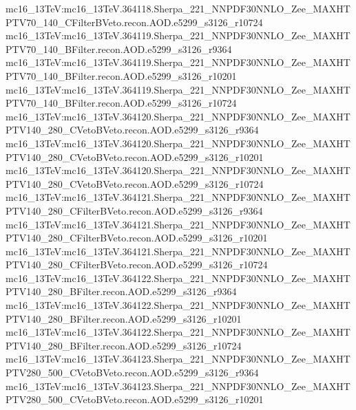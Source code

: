 { mc16\_13TeV:mc16\_13TeV.364118.Sherpa\_221\_NNPDF30NNLO\_Zee\_MAXHTPTV70\_140\_CFilterBVeto.recon.AOD.e5299\_s3126\_r10724 \newline  
 mc16\_13TeV:mc16\_13TeV.364119.Sherpa\_221\_NNPDF30NNLO\_Zee\_MAXHTPTV70\_140\_BFilter.recon.AOD.e5299\_s3126\_r9364   \newline
 mc16\_13TeV:mc16\_13TeV.364119.Sherpa\_221\_NNPDF30NNLO\_Zee\_MAXHTPTV70\_140\_BFilter.recon.AOD.e5299\_s3126\_r10201 \newline  
 mc16\_13TeV:mc16\_13TeV.364119.Sherpa\_221\_NNPDF30NNLO\_Zee\_MAXHTPTV70\_140\_BFilter.recon.AOD.e5299\_s3126\_r10724   \newline
 mc16\_13TeV:mc16\_13TeV.364120.Sherpa\_221\_NNPDF30NNLO\_Zee\_MAXHTPTV140\_280\_CVetoBVeto.recon.AOD.e5299\_s3126\_r9364  \newline 
 mc16\_13TeV:mc16\_13TeV.364120.Sherpa\_221\_NNPDF30NNLO\_Zee\_MAXHTPTV140\_280\_CVetoBVeto.recon.AOD.e5299\_s3126\_r10201 \newline
 mc16\_13TeV:mc16\_13TeV.364120.Sherpa\_221\_NNPDF30NNLO\_Zee\_MAXHTPTV140\_280\_CVetoBVeto.recon.AOD.e5299\_s3126\_r10724 \newline  
 mc16\_13TeV:mc16\_13TeV.364121.Sherpa\_221\_NNPDF30NNLO\_Zee\_MAXHTPTV140\_280\_CFilterBVeto.recon.AOD.e5299\_s3126\_r9364  \newline  
 mc16\_13TeV:mc16\_13TeV.364121.Sherpa\_221\_NNPDF30NNLO\_Zee\_MAXHTPTV140\_280\_CFilterBVeto.recon.AOD.e5299\_s3126\_r10201 \newline   
 mc16\_13TeV:mc16\_13TeV.364121.Sherpa\_221\_NNPDF30NNLO\_Zee\_MAXHTPTV140\_280\_CFilterBVeto.recon.AOD.e5299\_s3126\_r10724 \newline  
 mc16\_13TeV:mc16\_13TeV.364122.Sherpa\_221\_NNPDF30NNLO\_Zee\_MAXHTPTV140\_280\_BFilter.recon.AOD.e5299\_s3126\_r9364   \newline  
 mc16\_13TeV:mc16\_13TeV.364122.Sherpa\_221\_NNPDF30NNLO\_Zee\_MAXHTPTV140\_280\_BFilter.recon.AOD.e5299\_s3126\_r10201  \newline   
 mc16\_13TeV:mc16\_13TeV.364122.Sherpa\_221\_NNPDF30NNLO\_Zee\_MAXHTPTV140\_280\_BFilter.recon.AOD.e5299\_s3126\_r10724   \newline  
 mc16\_13TeV:mc16\_13TeV.364123.Sherpa\_221\_NNPDF30NNLO\_Zee\_MAXHTPTV280\_500\_CVetoBVeto.recon.AOD.e5299\_s3126\_r9364  \newline   
 mc16\_13TeV:mc16\_13TeV.364123.Sherpa\_221\_NNPDF30NNLO\_Zee\_MAXHTPTV280\_500\_CVetoBVeto.recon.AOD.e5299\_s3126\_r10201   \newline  
}
